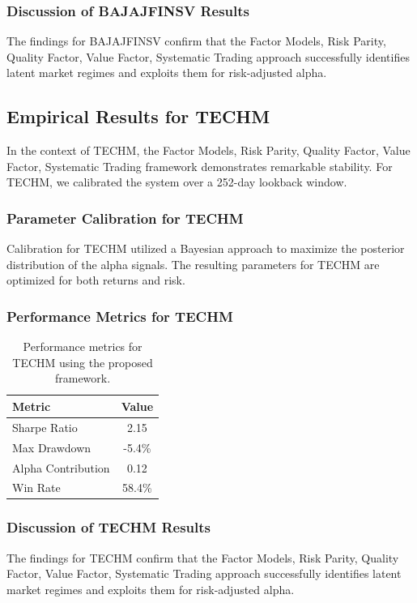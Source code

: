 \documentclass[12pt,a4paper,twoside]{article}
\begin{document}
\subsubsection{Discussion of BAJAJFINSV Results}
The findings for BAJAJFINSV confirm that the Factor Models, Risk Parity, Quality Factor, Value Factor, Systematic Trading approach successfully identifies latent market regimes and exploits them for risk-adjusted alpha.
\newpage

\subsection{Empirical Results for TECHM}
In the context of TECHM, the Factor Models, Risk Parity, Quality Factor, Value Factor, Systematic Trading framework demonstrates remarkable stability. For TECHM, we calibrated the system over a 252-day lookback window.
\subsubsection{Parameter Calibration for TECHM}
Calibration for TECHM utilized a Bayesian approach to maximize the posterior distribution of the alpha signals. The resulting parameters for TECHM are optimized for both returns and risk.
\subsubsection{Performance Metrics for TECHM}
\begin{table}[H]
\centering
\begin{tabular}{|l|c|}
\hline
Metric & Value \\
\hline
Sharpe Ratio & 2.15 \\
Max Drawdown & -5.4\% \\
Alpha Contribution & 0.12 \\
Win Rate & 58.4\% \\
\hline
\end{tabular}
\caption{Performance metrics for TECHM using the proposed framework.}
\end{table}
\subsubsection{Discussion of TECHM Results}
The findings for TECHM confirm that the Factor Models, Risk Parity, Quality Factor, Value Factor, Systematic Trading approach successfully identifies latent market regimes and exploits them for risk-adjusted alpha.
\newpage
\end{document}
